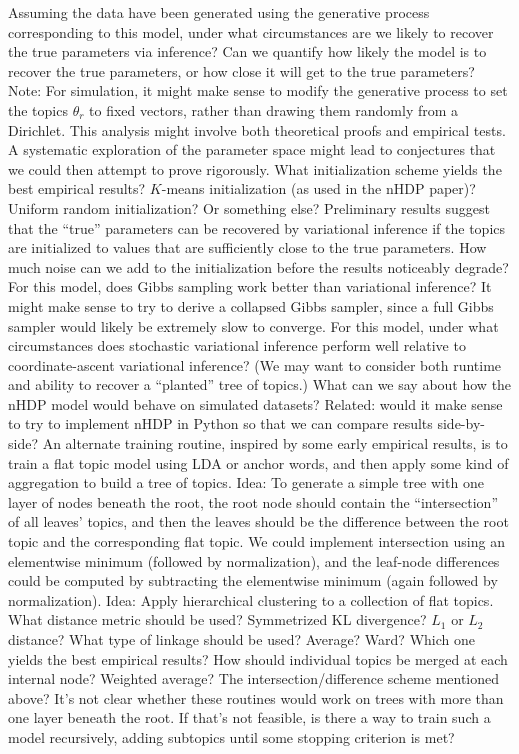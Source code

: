 \documentclass{article}
\begin{document}
\begin{outline}
\1 Assuming the data have been generated using the generative process corresponding to this model, under what circumstances are we likely to recover the true parameters via inference?
  \2 Can we quantify how likely the model is to recover the true parameters, or how close it will get to the true parameters?
  \2 Note: For simulation, it might make sense to modify the generative process to set the topics $\theta_r$ to fixed vectors, rather than drawing them randomly from a Dirichlet.
  \2 This analysis might involve both theoretical proofs and empirical tests.  A systematic exploration of the parameter space might lead to conjectures that we could then attempt to prove rigorously.
\1 What initialization scheme yields the best empirical results?  $K$-means initialization (as used in the nHDP paper)?  Uniform random initialization?  Or something else?
\1 Preliminary results suggest that the ``true'' parameters can be recovered by variational inference if the topics are initialized to values that are sufficiently close to the true parameters.  How much noise can we add to the initialization before the results noticeably degrade?
\1 For this model, does Gibbs sampling work better than variational inference?
  \2 It might make sense to try to derive a collapsed Gibbs sampler, since a full Gibbs sampler would likely be extremely slow to converge.
\1 For this model, under what circumstances does stochastic variational inference perform well relative to coordinate-ascent variational inference?  (We may want to consider both runtime and ability to recover a ``planted'' tree of topics.)
\1 What can we say about how the nHDP model would behave on simulated datasets?
  \2 Related: would it make sense to try to implement nHDP in Python so that we can compare results side-by-side?
\1 An alternate training routine, inspired by some early empirical results, is to train a flat topic model using LDA or anchor words, and then apply some kind of aggregation to build a tree of topics.
  \2 Idea: To generate a simple tree with one layer of nodes beneath the root, the root node should contain the ``intersection'' of all leaves' topics, and then the leaves should be the difference between the root topic and the corresponding flat topic.  We could implement intersection using an elementwise minimum (followed by normalization), and the leaf-node differences could be computed by subtracting the elementwise minimum (again followed by normalization).
  \2 Idea: Apply hierarchical clustering to a collection of flat topics.
    \3 What distance metric should be used?  Symmetrized KL divergence?  $L_1$ or $L_2$ distance?
    \3 What type of linkage should be used?  Average?  Ward?  Which one yields the best empirical results?
    \3 How should individual topics be merged at each internal node?  Weighted average?  The intersection/difference scheme mentioned above?
  \2 It's not clear whether these routines would work on trees with more than one layer beneath the root.  If that's not feasible, is there a way to train such a model recursively, adding subtopics until some stopping criterion is met?
\end{outline}

%
%
\end{document}
